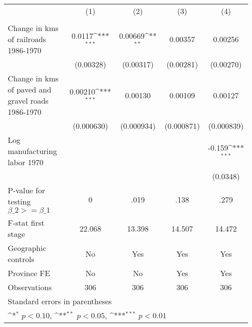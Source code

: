 {
\def\sym#1{\ifmmode^{#1}\else\(^{#1}\)\fi}
\begin{tabular}{l*{4}{c}}
\hline\hline
                &\multicolumn{1}{c}{(1)}&\multicolumn{1}{c}{(2)}&\multicolumn{1}{c}{(3)}&\multicolumn{1}{c}{(4)}\\
                &\multicolumn{1}{c}{}&\multicolumn{1}{c}{}&\multicolumn{1}{c}{}&\multicolumn{1}{c}{}\\
\hline
Change in kms of railroads 1986-1970&   0.0117\sym{***}&  0.00669\sym{**} &  0.00357         &  0.00256         \\
                &(0.00328)         &(0.00317)         &(0.00281)         &(0.00270)         \\
[1em]
Change in kms of paved and gravel roads 1986-1970&  0.00210\sym{***}&  0.00130         &  0.00109         &  0.00127         \\
                &(0.000630)         &(0.000934)         &(0.000871)         &(0.000839)         \\
[1em]
Log manufacturing labor 1970&                  &                  &                  &   -0.159\sym{***}\\
                &                  &                  &                  & (0.0348)         \\
\hline
P-value for testing $\beta\_{2} >= \beta\_{1}$&        0         &     .019         &     .138         &     .279         \\
F-stat first stage&   22.068         &   13.398         &   14.507         &   14.472         \\
Geographic controls&       No         &      Yes         &      Yes         &      Yes         \\
Province FE     &       No         &       No         &      Yes         &      Yes         \\
Observations    &      306         &      306         &      306         &      306         \\
\hline\hline
\multicolumn{5}{l}{\footnotesize Standard errors in parentheses}\\
\multicolumn{5}{l}{\footnotesize \sym{*} \(p<0.10\), \sym{**} \(p<0.05\), \sym{***} \(p<0.01\)}\\
\end{tabular}
}
